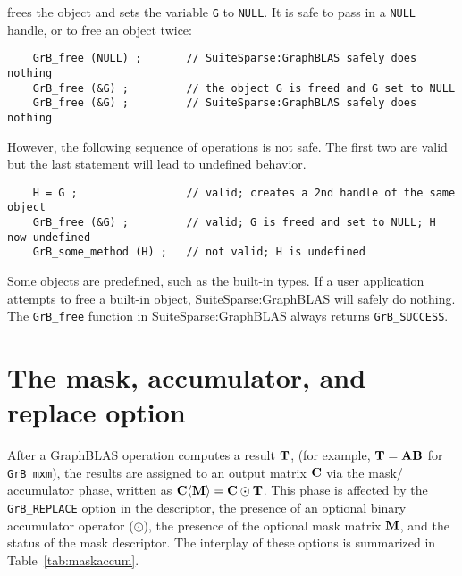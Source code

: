 \documentclass[12pt]{article}
\begin{document}
{\noindent
frees the object and sets the variable \verb'G' to \verb'NULL'.  It is safe to
pass in a \verb'NULL' handle, or to free an object twice:

    {\footnotesize
    \begin{verbatim}
    GrB_free (NULL) ;       // SuiteSparse:GraphBLAS safely does nothing
    GrB_free (&G) ;         // the object G is freed and G set to NULL
    GrB_free (&G) ;         // SuiteSparse:GraphBLAS safely does nothing \end{verbatim} }

\noindent
However, the following sequence of operations is not safe.  The first two are
valid but the last statement will lead to undefined behavior.

    {\footnotesize
    \begin{verbatim}
    H = G ;                 // valid; creates a 2nd handle of the same object
    GrB_free (&G) ;         // valid; G is freed and set to NULL; H now undefined
    GrB_some_method (H) ;   // not valid; H is undefined \end{verbatim}}

Some objects are predefined, such as the built-in types.  If a user application
attempts to free a built-in object, SuiteSparse:GraphBLAS will safely do
nothing.  The \verb'GrB_free' function in SuiteSparse:GraphBLAS always
returns \verb'GrB_SUCCESS'.

\newpage
\section{The mask, accumulator, and replace option} %
\label{sec:maskaccum}

After a GraphBLAS operation computes a result ${\bf T}$, (for example, ${\bf
T=AB}$ for \verb'GrB_mxm'), the results are assigned to an output matrix ${\bf
C}$ via the mask/ accumulator phase, written as ${\bf C \langle M \rangle = C
\odot T}$.  This phase is affected by the \verb'GrB_REPLACE' option in the
descriptor, the presence of an optional binary accumulator operator ($\odot$),
the presence of the optional mask matrix ${\bf M}$, and the status of the mask
descriptor.  The interplay of these options is summarized in
Table~\ref{tab:maskaccum}.

}
\end{document}
